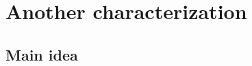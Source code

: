 \documentclass[11pt,a4paper]{article} %
\begin{document}
    \title{\rmfamily\normalfont{}}
    \author{ \\ }
    \date{\today} 
    
    \maketitle
    
    \begin{abstract}
        This short document is a collection of some \emph{Riordan arrays}, coloured 
        according different partition schemes.
    \end{abstract}
       
    \tableofcontents

    \newpage

    \section{Another characterization}

    \subsection{Main idea}
\end{document}
